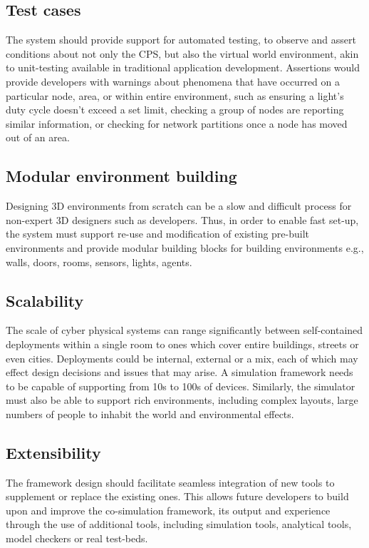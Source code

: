 \subsection{Test cases}
\label{sub:requirements_test_cases} 
The system should provide support for automated testing, to observe and assert conditions about not only the CPS, but also the virtual world environment, akin to unit-testing available in traditional application development. Assertions would provide developers with warnings about phenomena that have occurred on a particular node, area, or within entire environment, such as ensuring a light's duty cycle doesn't exceed a set limit, checking a group of nodes are reporting similar information, or checking for network partitions once a node has moved out of an area.


\subsection{Modular environment building}
\label{sub:requirements_modular_building}
Designing 3D environments from scratch can be a slow and difficult process for non-expert 3D designers such as developers. Thus, in order to enable fast set-up, the system must support re-use and modification of existing pre-built environments and provide modular building blocks for building environments e.g., walls, doors, rooms, sensors, lights, agents.


\subsection{Scalability} %
\label{sub:requirements_scalability}
The scale of cyber physical systems can range significantly between self-contained deployments within a single room to ones which cover entire buildings, streets or even cities. Deployments could be internal, external or a mix, each of which may effect design decisions and issues that may arise. A simulation framework needs to be capable of supporting from 10s to 100s of devices. Similarly, the simulator must also be able to support rich environments, including complex layouts, large numbers of people to inhabit the world and environmental effects.



\subsection{Extensibility} %
\label{sub:requirements_extensibility}
The framework design should facilitate seamless integration of new tools to supplement or replace the existing ones. This allows future developers to build upon and improve the co-simulation framework, its output and experience through the use of additional tools, including simulation tools, analytical tools, model checkers or real test-beds.


